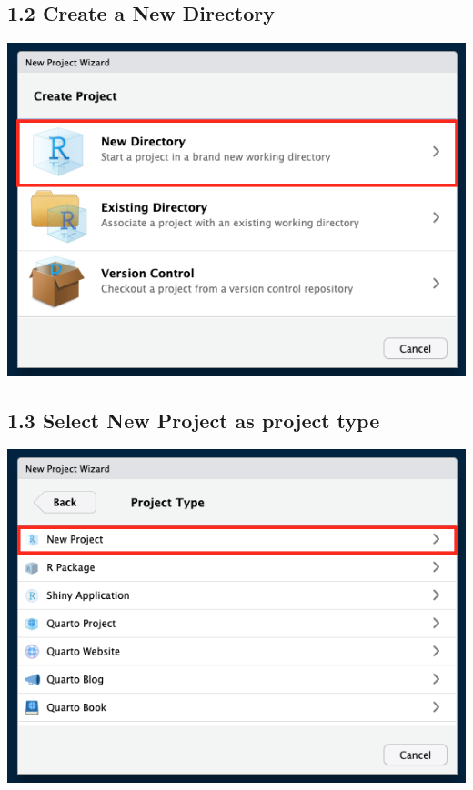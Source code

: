 \documentclass[
  12pt,
]{book}
\begin{document}
\hypertarget{create-a-new-directory}{%
\subsection{\texorpdfstring{1.2 Create a \textbf{New Directory}}{1.2 Create a New Directory}}\label{create-a-new-directory}}

\includegraphics{images/new_project3.png}

\hypertarget{select-new-project-as-project-type}{%
\subsection{\texorpdfstring{1.3 Select \textbf{New Project} as project type}{1.3 Select New Project as project type}}\label{select-new-project-as-project-type}}

\includegraphics{images/new_project4.png}
\end{document}

